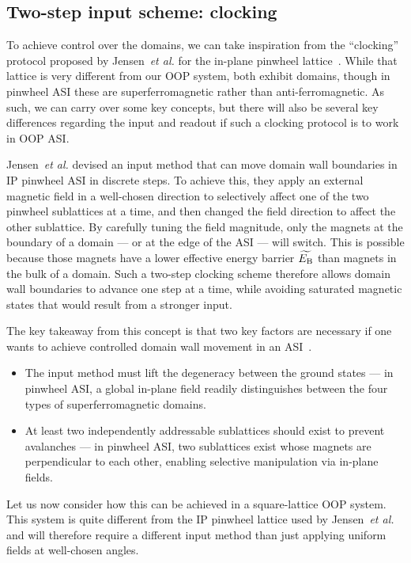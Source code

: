 \subsection{Two-step input scheme: clocking}
To achieve control over the domains, we can take inspiration from the ``clocking'' protocol proposed by Jensen~\textit{et al.} for the in-plane pinwheel lattice~\cite{clocking-protocol}.
While that lattice is very different from our OOP system, both exhibit domains, though in pinwheel ASI these are superferromagnetic rather than anti-ferromagnetic.
As such, we can carry over some key concepts, but there will also be several key differences regarding the input and readout if such a clocking protocol is to work in OOP ASI. \par
Jensen~\textit{et al.} devised an input method that can move domain wall boundaries in IP pinwheel ASI in discrete steps.
To achieve this, they apply an external magnetic field in a well-chosen direction to selectively affect one of the two pinwheel sublattices at a time, and then changed the field direction to affect the other sublattice.
By carefully tuning the field magnitude, only the magnets at the boundary of a domain --- or at the edge of the ASI --- will switch.
This is possible because those magnets have a lower effective energy barrier $\widetilde{E_\mathrm{B}}$ than magnets in the bulk of a domain.
Such a two-step clocking scheme therefore allows domain wall boundaries to advance one step at a time, while avoiding saturated magnetic states that would result from a stronger input. \par
The key takeaway from this concept is that two key factors are necessary if one wants to achieve controlled domain wall movement in an ASI~\cite{MAES-24}.
\begin{itemize}
	\item The input method must lift the degeneracy between the ground states --- in pinwheel ASI, a global in-plane field readily distinguishes between the four types of superferromagnetic domains.
	\item At least two independently addressable sublattices should exist to prevent avalanches --- in pinwheel ASI, two sublattices exist whose magnets are perpendicular to each other, enabling selective manipulation via in-plane fields.
\end{itemize}
Let us now consider how this can be achieved in a square-lattice OOP system.
This system is quite different from the IP pinwheel lattice used by Jensen~\textit{et al.}~\cite{clocking-protocol} and will therefore require a different input method than just applying uniform fields at well-chosen angles.

